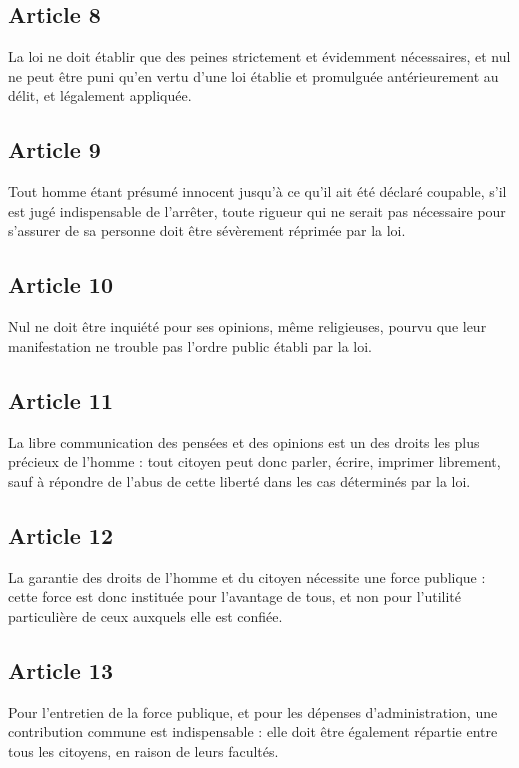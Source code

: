 \documentclass[11pt,a4paper]{article}
\begin{document}
\subsection*{Article 8}

La loi ne doit établir que des peines strictement et évidemment nécessaires, et nul ne peut être puni qu'en vertu d'une loi établie et promulguée antérieurement au délit, et légalement appliquée.

\subsection*{Article 9}

Tout homme étant présumé innocent jusqu'à ce qu'il ait été déclaré coupable, s'il est jugé indispensable de l'arrêter, toute rigueur qui ne serait pas nécessaire pour s'assurer de sa personne doit être sévèrement réprimée par la loi.

\subsection*{Article 10}

Nul ne doit être inquiété pour ses opinions, même religieuses, pourvu que leur manifestation ne trouble pas l'ordre public établi par la loi.

\subsection*{Article 11}

La libre communication des pensées et des opinions est un des droits les plus précieux de l'homme : tout citoyen peut donc parler, écrire, imprimer librement, sauf à répondre de l'abus de cette liberté dans les cas déterminés par la loi.

\subsection*{Article 12}

La garantie des droits de l'homme et du citoyen nécessite une force publique : cette force est donc instituée pour l'avantage de tous, et non pour l'utilité particulière de ceux auxquels elle est confiée.

\subsection*{Article 13}

Pour l'entretien de la force publique, et pour les dépenses d'administration, une contribution commune est indispensable : elle doit être également répartie entre tous les citoyens, en raison de leurs facultés.
\end{document}
